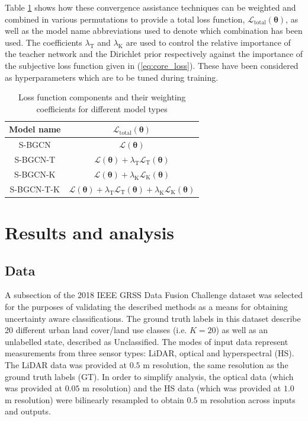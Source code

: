 \documentclass[
twocolumn,
]{ceurart}
\begin{document}
Table \ref{loss_table} shows how these convergence assistance techniques can be weighted and combined in various permutations to provide a total loss function, $\mathcal{L}_\text{total}(\boldsymbol{\theta})$, as well as the model name abbreviations used to denote which combination has been used.
The coefficients $\lambda_{\text{T}}$ and $\lambda_{\text{K}}$ are used to control the relative importance of the teacher network and the Dirichlet prior respectively against the importance of the subjective loss function given in (\ref{eq:core_loss}).
These have been considered as hyperparameters which are to be tuned during training.

\begin{table}
\scriptsize
\renewcommand{\arraystretch}{1.5}
\caption{Loss function components and their weighting coefficients for different model types}
\label{loss_table}
\centering
\begin{tabular}{cc}
\hline
\bfseries Model name & \bfseries $\mathcal{L}_{\text{total}}(\boldsymbol{\theta})$\\
\hline
S-BGCN & $\mathcal{L}(\boldsymbol{\theta})$ \\
S-BGCN-T & $\mathcal{L}(\boldsymbol{\theta})+\lambda_{\text{T}}\mathcal{L}_{\text{T}}(\boldsymbol{\theta})$ \\
S-BGCN-K & $\mathcal{L}(\boldsymbol{\theta})+\lambda_{\text{K}}\mathcal{L}_{\text{K}}(\boldsymbol{\theta})$ \\
S-BGCN-T-K & $\mathcal{L}(\boldsymbol{\theta})+\lambda_{\text{T}}\mathcal{L}_{\text{T}}(\boldsymbol{\theta})+\lambda_{\text{K}}\mathcal{L}_{\text{K}}(\boldsymbol{\theta})$ \\
\hline
\end{tabular}
\end{table}

\section{Results and analysis}
\label{sec::results}
\subsection{Data}
A subsection of the 2018 IEEE GRSS Data Fusion Challenge dataset was selected for the purposes of validating the described methods as a means for obtaining uncertainty aware classifications.
The ground truth labels in this dataset describe 20 different urban land cover/land use classes (i.e. $K=20$) as well as an unlabelled state, described as Unclassified.
The modes of input data represent measurements from three sensor types: LiDAR, optical and hyperspectral (HS).
The LiDAR data was provided at $0.5$ m resolution, the same resolution as the ground truth labels (GT).
In order to simplify analysis, the optical data (which was provided at $0.05$ m resolution) and the HS data (which was provided at $1.0$ m resolution) were bilinearly resampled to obtain $0.5$ m resolution across inputs and outputs.
\end{document}
